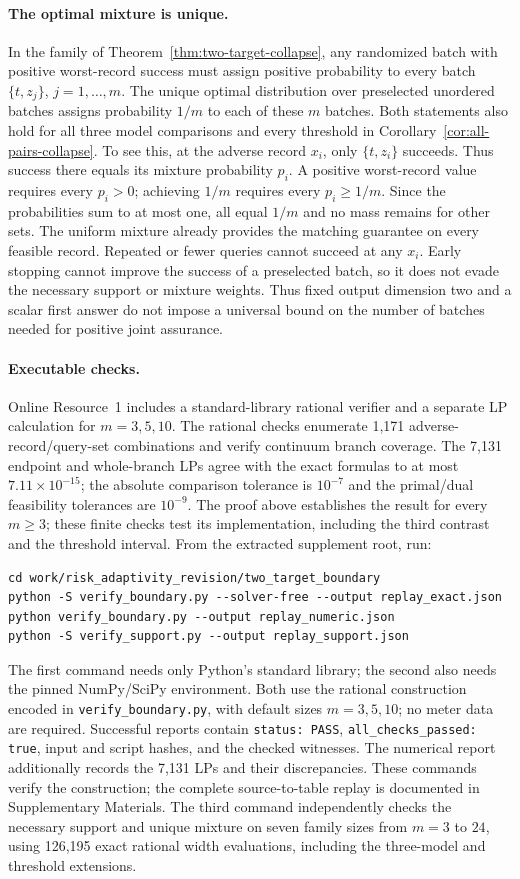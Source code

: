 \documentclass[12pt]{article}
\begin{document}
\paragraph{The optimal mixture is unique.}
In the family of Theorem~\ref{thm:two-target-collapse}, any randomized
batch with positive worst-record success must assign positive probability
to every batch $\{t,z_j\}$, $j=1,\ldots,m$. The unique optimal distribution
over preselected unordered batches assigns probability $1/m$ to each of these
$m$ batches. Both statements also hold for all three model comparisons and
every threshold in Corollary~\ref{cor:all-pairs-collapse}.
To see this, at the adverse record $x_i$, only $\{t,z_i\}$ succeeds.
Thus success there equals its mixture probability $p_i$. A positive
worst-record value requires every $p_i>0$; achieving $1/m$ requires every
$p_i\geq1/m$. Since the probabilities sum to at most one, all equal
$1/m$ and no mass remains for other sets. The uniform mixture already
provides the matching guarantee on every feasible record.
Repeated or fewer queries cannot succeed at any $x_i$. Early stopping
cannot improve the success of a preselected batch, so it does not evade
the necessary support or mixture weights. Thus fixed output dimension two
and a scalar first answer do not impose a universal bound on the number
of batches needed for positive joint assurance.

\paragraph{Executable checks.}
Online Resource~1 includes a standard-library rational verifier and a
separate LP calculation for $m=3,5,10$. The rational checks enumerate
1,171 adverse-record/query-set combinations and verify continuum branch
coverage. The 7,131 endpoint and whole-branch LPs agree with the exact
formulas to at most $7.11\times10^{-15}$; the absolute comparison tolerance
is $10^{-7}$ and the primal/dual feasibility tolerances are $10^{-9}$.
The proof above establishes the result for every $m\geq3$; these finite
checks test its implementation, including the third contrast and the
threshold interval. From the extracted supplement root, run:
\begin{verbatim}
cd work/risk_adaptivity_revision/two_target_boundary
python -S verify_boundary.py --solver-free --output replay_exact.json
python verify_boundary.py --output replay_numeric.json
python -S verify_support.py --output replay_support.json
\end{verbatim}
The first command needs only Python's standard library; the second also
needs the pinned NumPy/SciPy environment. Both use the rational construction
encoded in \texttt{verify\_boundary.py}, with default sizes $m=3,5,10$;
no meter data are required. Successful reports contain
\texttt{status: PASS}, \texttt{all\_checks\_passed: true}, input and script
hashes, and the checked witnesses. The numerical report additionally records
the 7,131 LPs and their discrepancies. These commands verify the construction;
the complete source-to-table replay is documented in Supplementary Materials.
The third command independently checks the necessary support and unique
mixture on seven family sizes from $m=3$ to $24$, using 126,195 exact rational
width evaluations, including the three-model and threshold extensions.
\end{document}
